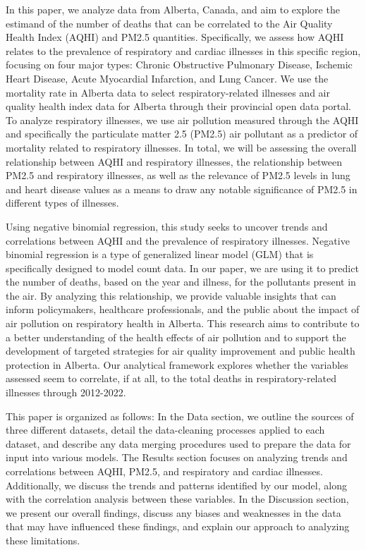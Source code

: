 \documentclass[
  letterpaper,
  DIV=11,
  numbers=noendperiod]{scrartcl}
\begin{document}
In this paper, we analyze data from Alberta, Canada, and aim to explore
the estimand of the number of deaths that can be correlated to the Air
Quality Health Index (AQHI) and PM2.5 quantities. Specifically, we
assess how AQHI relates to the prevalence of respiratory and cardiac
illnesses in this specific region, focusing on four major types: Chronic
Obstructive Pulmonary Disease, Ischemic Heart Disease, Acute Myocardial
Infarction, and Lung Cancer. We use the mortality rate in Alberta data
to select respiratory-related illnesses and air quality health index
data for Alberta through their provincial open data portal. To analyze
respiratory illnesses, we use air pollution measured through the AQHI
and specifically the particulate matter 2.5 (PM2.5) air pollutant as a
predictor of mortality related to respiratory illnesses. In total, we
will be assessing the overall relationship between AQHI and respiratory
illnesses, the relationship between PM2.5 and respiratory illnesses, as
well as the relevance of PM2.5 levels in lung and heart disease values
as a means to draw any notable significance of PM2.5 in different types
of illnesses.

Using negative binomial regression, this study seeks to uncover trends
and correlations between AQHI and the prevalence of respiratory
illnesses. Negative binomial regression is a type of generalized linear
model (GLM) that is specifically designed to model count data. In our
paper, we are using it to predict the number of deaths, based on the
year and illness, for the pollutants present in the air. By analyzing
this relationship, we provide valuable insights that can inform
policymakers, healthcare professionals, and the public about the impact
of air pollution on respiratory health in Alberta. This research aims to
contribute to a better understanding of the health effects of air
pollution and to support the development of targeted strategies for air
quality improvement and public health protection in Alberta. Our
analytical framework explores whether the variables assessed seem to
correlate, if at all, to the total deaths in respiratory-related
illnesses through 2012-2022.

This paper is organized as follows: In the Data section, we outline the
sources of three different datasets, detail the data-cleaning processes
applied to each dataset, and describe any data merging procedures used
to prepare the data for input into various models. The Results section
focuses on analyzing trends and correlations between AQHI, PM2.5, and
respiratory and cardiac illnesses. Additionally, we discuss the trends
and patterns identified by our model, along with the correlation
analysis between these variables. In the Discussion section, we present
our overall findings, discuss any biases and weaknesses in the data that
may have influenced these findings, and explain our approach to
analyzing these limitations.
\end{document}
